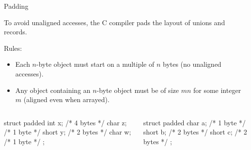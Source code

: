 \documentclass{plt}
\begin{document}
\begin{frame}[fragile]{Padding}

To avoid unaligned accesses, the C compiler pads the layout of unions
and records.

Rules:

\begin{itemize}
  \item Each $n$-byte object must start on a multiple of $n$ bytes (no
    unaligned accesses).

   \item Any object containing an $n$-byte object must be of size $mn$ for some
     integer $m$ (aligned even when arrayed).
\end{itemize}

\begin{columns}
  \begin{column}[t]{0.5\textwidth}
\begin{C}
struct padded {
  int x;   /* 4 bytes */
  char z;  /* 1 byte  */
  short y; /* 2 bytes */
  char w;  /* 1 byte  */
};
\end{C}

  \end{column}
  \begin{column}[t]{0.5\textwidth}
\begin{C}
struct padded {
  char a;  /* 1 byte  */
  short b; /* 2 bytes */
  short c; /* 2 bytes */
};
\end{C}

  \end{column}
\end{columns}

\end{frame}
\end{document}

